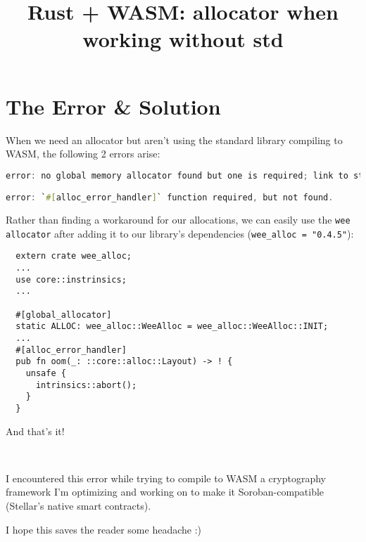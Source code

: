 \documentclass{article}
\title{Rust + WASM: allocator when working without std }
\begin{document}
\maketitle


\section{The Error \& Solution}

When we need an allocator but aren't using the standard library compiling to WASM, the following 2 errors arise:

\begin{lstlisting}[breaklines, language=Rust]
error: no global memory allocator found but one is required; link to std or add `#[global_allocator]` to a static item that implements the GlobalAlloc trait.

error: `#[alloc_error_handler]` function required, but not found.
\end{lstlisting}

Rather than finding a workaround for our allocations, we can easily use the \texttt{wee allocator} after adding it to our library's dependencies (\texttt{wee_alloc = "0.4.5"}):

\begin{verbatim}
  extern crate wee_alloc;
  ...
  use core::instrinsics;
  ...
  
  #[global_allocator]
  static ALLOC: wee_alloc::WeeAlloc = wee_alloc::WeeAlloc::INIT;
  ...
  #[alloc_error_handler]
  pub fn oom(_: ::core::alloc::Layout) -> ! {
    unsafe {
      intrinsics::abort();
    }
  }
\end{verbatim}

And that's it!

\

I encountered this error while trying to compile to WASM a cryptography framework I'm optimizing and working on to make it Soroban-compatible (Stellar's native smart contracts).

I hope this saves the reader some headache :)
\end{document}
